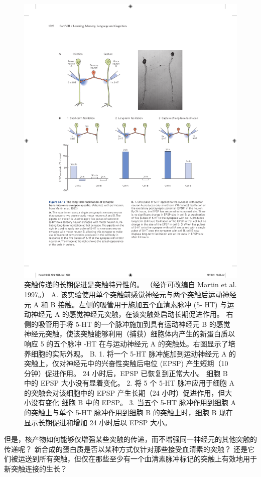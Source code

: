 \begin{figure}[htbp]
	\centering
	\includegraphics[width=0.9\linewidth]{chap53/fig_53_10}
	\caption{突触传递的长期促进是突触特异性的。 （经许可改编自 Martin et al. 1997。） A. 该实验使用单个突触前感觉神经元与两个突触后运动神经元 A 和 B 接触。左侧的吸管用于施加五个血清素脉冲 (5- HT) 与运动神经元 A 的感觉神经元突触，在该突触处启动长期促进作用。 右侧的吸管用于将 5-HT 的一个脉冲施加到具有运动神经元 B 的感觉神经元突触，使该突触能够利用（捕获）细胞体内产生的新蛋白质以响应 5 的五个脉冲 -HT 在与运动神经元 A 的突触处。右图显示了培养细胞的实际外观。 B. 1. 将一个 5-HT 脉冲施加到运动神经元 A 的突触上，仅对神经元中的兴奋性突触后电位 (EPSP) 产生短期（10 分钟）促进作用。 24 小时后，EPSP 已恢复到正常大小。 细胞 B 中的 EPSP 大小没有显着变化。 2. 将 5 个 5-HT 脉冲应用于细胞 A 的突触会对该细胞中的 EPSP 产生长期（24 小时）促进作用，但大小没有变化 细胞 B 中的 EPSP。 3. 当五个 5-HT 脉冲作用到细胞 A 的突触上与单个 5-HT 脉冲作用到细胞 B 的突触上时，细胞 B 现在显示长期促进和增加 24 小时后以 EPSP 大小。}
	\label{fig:53_10}
\end{figure}


但是，核产物如何能够仅增强某些突触的传递，而不增强同一神经元的其他突触的传递呢？
新合成的蛋白质是否以某种方式仅针对那些接受血清素的突触？
还是它们被运送到所有突触，但仅在那些至少有一个血清素脉冲标记的突触上有效地用于新突触连接的生长？


